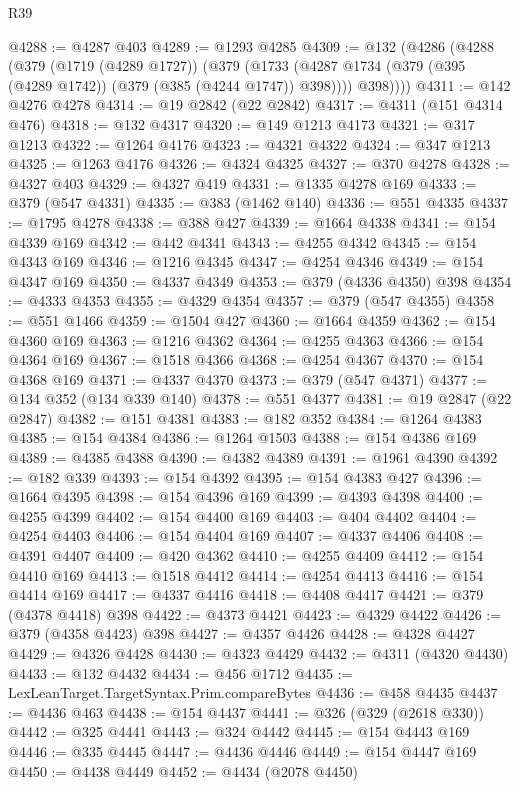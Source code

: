\begin{lexlean}{R39}
\begin{coremodule}
@4288 := @4287 @403
@4289 := @1293 @4285
@4309 := @132
    (@4286
      (@4288
        (@379
          (@1719 (@4289 @1727))
          (@379
            (@1733 (@4287 @1734 (@379 (@395 (@4289 @1742)) (@379 (@385 (@4244 @1747)) @398))))
            @398))))
@4311 := @142 @4276 @4278
@4314 := @19 @2842 (@22 @2842)
@4317 := @4311 (@151 @4314 @476)
@4318 := @132 @4317
@4320 := @149 @1213 @4173
@4321 := @317 @1213
@4322 := @1264 @4176
@4323 := @4321 @4322
@4324 := @347 @1213
@4325 := @1263 @4176
@4326 := @4324 @4325
@4327 := @370 @4278
@4328 := @4327 @403
@4329 := @4327 @419
@4331 := @1335 @4278 @169
@4333 := @379 (@547 @4331)
@4335 := @383 (@1462 @140)
@4336 := @551 @4335
@4337 := @1795 @4278
@4338 := @388 @427
@4339 := @1664 @4338
@4341 := @154 @4339 @169
@4342 := @442 @4341
@4343 := @4255 @4342
@4345 := @154 @4343 @169
@4346 := @1216 @4345
@4347 := @4254 @4346
@4349 := @154 @4347 @169
@4350 := @4337 @4349
@4353 := @379 (@4336 @4350) @398
@4354 := @4333 @4353
@4355 := @4329 @4354
@4357 := @379 (@547 @4355)
@4358 := @551 @1466
@4359 := @1504 @427
@4360 := @1664 @4359
@4362 := @154 @4360 @169
@4363 := @1216 @4362
@4364 := @4255 @4363
@4366 := @154 @4364 @169
@4367 := @1518 @4366
@4368 := @4254 @4367
@4370 := @154 @4368 @169
@4371 := @4337 @4370
@4373 := @379 (@547 @4371)
@4377 := @134 @352 (@134 @339 @140)
@4378 := @551 @4377
@4381 := @19 @2847 (@22 @2847)
@4382 := @151 @4381
@4383 := @182 @352
@4384 := @1264 @4383
@4385 := @154 @4384
@4386 := @1264 @1503
@4388 := @154 @4386 @169
@4389 := @4385 @4388
@4390 := @4382 @4389
@4391 := @1961 @4390
@4392 := @182 @339
@4393 := @154 @4392
@4395 := @154 @4383 @427
@4396 := @1664 @4395
@4398 := @154 @4396 @169
@4399 := @4393 @4398
@4400 := @4255 @4399
@4402 := @154 @4400 @169
@4403 := @404 @4402
@4404 := @4254 @4403
@4406 := @154 @4404 @169
@4407 := @4337 @4406
@4408 := @4391 @4407
@4409 := @420 @4362
@4410 := @4255 @4409
@4412 := @154 @4410 @169
@4413 := @1518 @4412
@4414 := @4254 @4413
@4416 := @154 @4414 @169
@4417 := @4337 @4416
@4418 := @4408 @4417
@4421 := @379 (@4378 @4418) @398
@4422 := @4373 @4421
@4423 := @4329 @4422
@4426 := @379 (@4358 @4423) @398
@4427 := @4357 @4426
@4428 := @4328 @4427
@4429 := @4326 @4428
@4430 := @4323 @4429
@4432 := @4311 (@4320 @4430)
@4433 := @132 @4432
@4434 := @456 @1712
@4435 := LexLeanTarget.TargetSyntax.Prim.compareBytes
@4436 := @458 @4435
@4437 := @4436 @463
@4438 := @154 @4437
@4441 := @326 (@329 (@2618 @330))
@4442 := @325 @4441
@4443 := @324 @4442
@4445 := @154 @4443 @169
@4446 := @335 @4445
@4447 := @4436 @4446
@4449 := @154 @4447 @169
@4450 := @4438 @4449
@4452 := @4434 (@2078 @4450)

\end{coremodule}
\end{lexlean}
